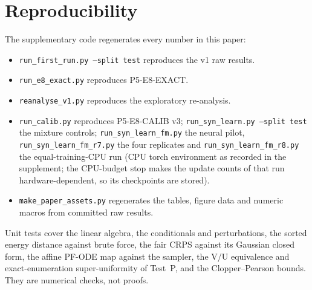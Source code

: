 \documentclass{article}
\theoremstyle{plain}
\theoremstyle{definition}
\theoremstyle{remark}
\begin{document}
\section{Reproducibility}
\label{app:repro}
The supplementary code regenerates every number in this paper:
\begin{itemize}
\item \texttt{run\_first\_run.py --split test} reproduces the v1 raw results.
\item \texttt{run\_e8\_exact.py} reproduces P5-E8-EXACT.
\item \texttt{reanalyse\_v1.py} reproduces the exploratory re-analysis.
\item \texttt{run\_calib.py} reproduces P5-E8-CALIB v3; \texttt{run\_syn\_learn.py --split test} the mixture controls; \texttt{run\_syn\_learn\_fm.py} the neural pilot, \texttt{run\_syn\_learn\_fm\_r7.py} the four replicates and \texttt{run\_syn\_learn\_fm\_r8.py} the equal-training-CPU run (CPU torch environment as recorded in the supplement; the CPU-budget stop makes the update counts of that run hardware-dependent, so its checkpoints are stored).
\item \texttt{make\_paper\_assets.py} regenerates the tables, figure data and numeric macros from committed raw results.
\end{itemize}
Unit tests cover the linear algebra, the conditionals and perturbations, the sorted energy distance against brute force, the fair CRPS against its Gaussian closed form, the affine PF-ODE map against the sampler, the V/U equivalence and exact-enumeration super-uniformity of Test~P, and the Clopper--Pearson bounds. They are numerical checks, not proofs.
\end{document}
